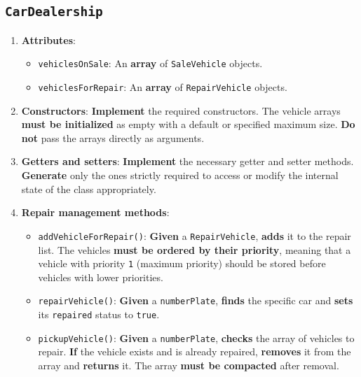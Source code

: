 \subsection{\texttt{CarDealership}}

\begin{enumerate}

    \item \textbf{Attributes}:

        \begin{itemize}

            \item \texttt{vehiclesOnSale}: An \textbf{array} of \texttt{SaleVehicle} objects.

            \item \texttt{vehiclesForRepair}: An \textbf{array} of \texttt{RepairVehicle} objects.

        \end{itemize}

    \item \textbf{Constructors}: \textbf{Implement} the required constructors. The vehicle arrays \textbf{must be initialized} as empty with a default or specified maximum size. \textbf{Do not} pass the arrays directly as arguments.

    \item \textbf{Getters and setters}: \textbf{Implement} the necessary getter and setter methods. \textbf{Generate} only the ones strictly required to access or modify the internal state of the class appropriately.

    \item \textbf{Repair management methods}:

        \begin{itemize}

            \item \texttt{addVehicleForRepair()}: \textbf{Given} a \texttt{RepairVehicle}, \textbf{adds} it to the repair list. The vehicles \textbf{must be ordered by their priority}, meaning that a vehicle with priority \texttt{1} (maximum priority) should be stored before vehicles with lower priorities.

            \item \texttt{repairVehicle()}: \textbf{Given} a \texttt{numberPlate}, \textbf{finds} the specific car and \textbf{sets} its \texttt{repaired} status to \texttt{true}.

            \item \texttt{pickupVehicle()}: \textbf{Given} a \texttt{numberPlate}, \textbf{checks} the array of vehicles to repair. \textbf{If} the vehicle exists and is already repaired, \textbf{removes} it from the array and \textbf{returns} it. The array \textbf{must be compacted} after removal.


\end{itemize}
\end{enumerate}
